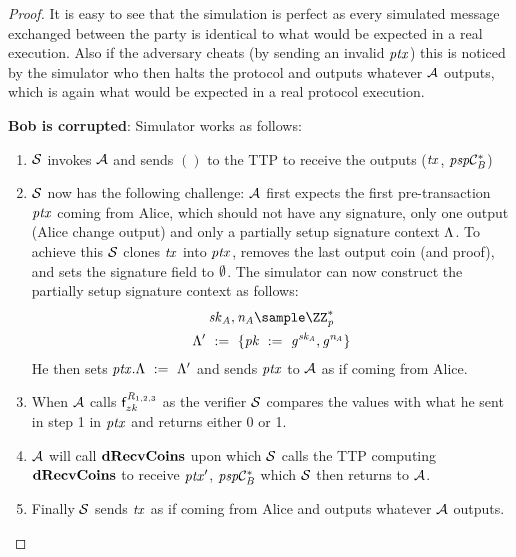 \begin{proof}
    It is easy to see that the simulation is perfect as every simulated message exchanged between the party is identical to what would be expected in a real execution.
    Also if the adversary cheats (by sending an invalid $\mathit{ptx}$) this is noticed by the simulator who then halts the protocol and outputs whatever $\mathcal{A}$ outputs, which is again what would be expected in a real protocol execution.

    \textbf{Bob is corrupted}: Simulator works as follows:
    \begin{enumerate}
        \item $\mathcal{S}$ invokes $\mathcal{A}$ and sends $()$ to the TTP to receive the outputs ($\mathit{tx}$, $\mathit{psp}\mathcal{C}_{\mathit{B}}^*$)
        \item $\mathcal{S}$ now has the following challenge: $\mathcal{A}$ first expects the first pre-transaction $\mathit{ptx}$ coming from Alice, which should not have any signature, only one output (Alice change output) and only a partially setup signature context $\Lambda$.
        To achieve this $\mathcal{S}$ clones $\mathit{tx}$ into $\mathit{ptx}$, removes the last output coin (and proof), and sets the signature field to $\emptyset$.
        The simulator can now construct the partially setup signature context as follows:
        \begin{gather*}
            \varSecKeyAlice, \varNonceAlice \sample \cnstIntegersPrimeWithoutZero{\varPrime} \\
            \funStarAlt{\varSigContext} \opAssign \{ \varPubKey \opAssign \funGen{\varSecKeyAlice}, \funGen{\varNonceAlice} \}
        \end{gather*}
        He then sets $\mathit{ptx}.\Lambda ~:=~ {\Lambda}'$ and sends $\mathit{ptx}$ to $\mathcal{A}$ as if coming from Alice.
        \item When $\mathcal{A}$ calls $\mathsf{f}^{\mathit{R}_{1,2,3}}_{zk}$ as the verifier $\mathcal{S}$ compares the values with what he sent in step 1 in $\mathit{ptx}$ and returns either 0 or 1.
        \item $\mathcal{A}$ will call $\mathbf{dRecvCoins}$ upon which $\mathcal{S}$ calls the TTP computing $\mathbf{dRecvCoins}$ to receive ${\mathit{ptx}}'$, $\mathit{psp}\mathcal{C}_{\mathit{B}}^*$ which $\mathcal{S}$ then returns to $\mathcal{A}$.
        \item Finally $\mathcal{S}$ sends $\mathit{tx}$ as if coming from Alice and outputs whatever $\mathcal{A}$ outputs.
    \end{enumerate}


\end{proof}
